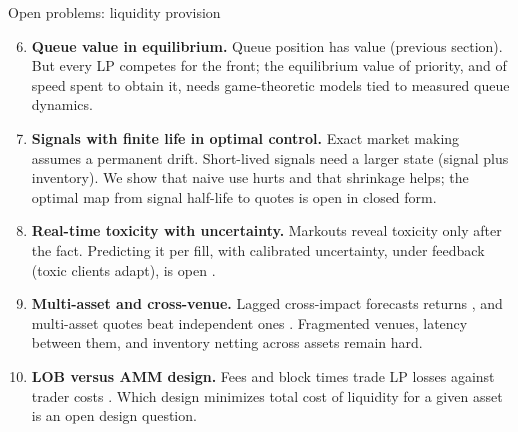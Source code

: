\begin{frame}{Open problems: liquidity provision}
  \small
  \begin{enumerate}
    \setcounter{enumi}{5}
    \item \textbf{Queue value in equilibrium.} Queue position has value (previous section). But every LP competes for the front; the equilibrium value of priority, and of speed spent to obtain it, needs game-theoretic models tied to measured queue dynamics.
    \item \textbf{Signals with finite life in optimal control.} Exact market making assumes a permanent drift. Short-lived signals need a larger state (signal plus inventory). We show that naive use hurts and that shrinkage helps; the optimal map from signal half-life to quotes is open in closed form.
    \item \textbf{Real-time toxicity with uncertainty.} Markouts reveal toxicity only after the fact. Predicting it per fill, with calibrated uncertainty, under feedback (toxic clients adapt), is open \citep{cartea2023detecting}.
    \item \textbf{Multi-asset and cross-venue.} Lagged cross-impact forecasts returns \citep{cont2023cross}, and multi-asset quotes beat independent ones \citep{gueant2017optimal}. Fragmented venues, latency between them, and inventory netting across assets remain hard.
    \item \textbf{LOB versus AMM design.} Fees and block times trade LP losses against trader costs \citep{milionis2023fees}. Which design minimizes total cost of liquidity for a given asset is an open design question.
  \end{enumerate}
\end{frame}
